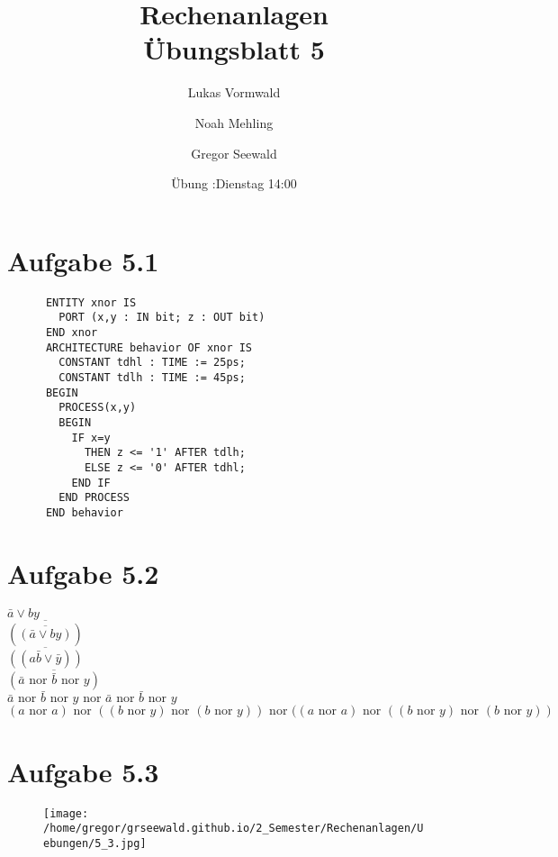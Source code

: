 \documentclass[11pt,a4paper]{article}
\title{Rechenanlagen\\Übungsblatt 5}
\author{Lukas Vormwald \and Noah Mehling \and Gregor Seewald}
\date{Übung :Dienstag 14:00}
\newcommand{\nor}[0]{\ensuremath{\text{ nor }}}
\begin{document}
\maketitle
  \section*{Aufgabe 5.1}
    \begin{lstlisting}
      ENTITY xnor IS
        PORT (x,y : IN bit; z : OUT bit)
      END xnor
      ARCHITECTURE behavior OF xnor IS
        CONSTANT tdhl : TIME := 25ps;
        CONSTANT tdlh : TIME := 45ps;
      BEGIN
        PROCESS(x,y)
        BEGIN
          IF x=y
            THEN z <= '1' AFTER tdlh;
            ELSE z <= '0' AFTER tdhl;
          END IF
        END PROCESS
      END behavior
    \end{lstlisting}

  \section*{Aufgabe 5.2}
    $\bar a \vee by$\\
    $\overline{(\overline{(\bar a \vee by)})}$\\
    $\overline{((a \bar b \vee \bar y))}$\\
    $\overline{(\bar a \nor \bar b \nor y)}$\\
    $\bar a \nor \bar b \nor y \nor \bar a \nor \bar b \nor y$\\
    $(a \nor a) \nor ((b \nor y) \nor (b \nor y)) \nor ((a \nor a) \nor ((b \nor y) \nor (b \nor y))$

\newpage

  \section*{Aufgabe 5.3}

  \begin{figure}[ht!]
    \centering
    \texttt{[image: /home/gregor/grseewald.github.io/2\_Semester/Rechenanlagen/Uebungen/5\_3.jpg]}
  \end{figure}
\end{document}

